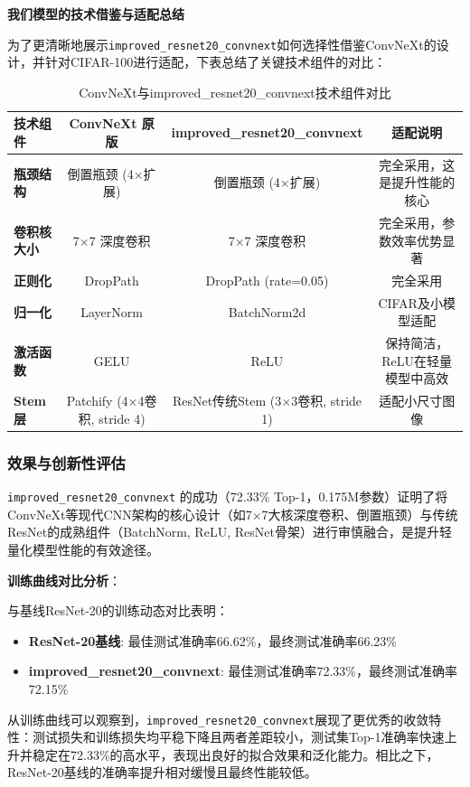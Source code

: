\documentclass[a4paper]{article}
\begin{document}
\begin{description}
\textbf{我们模型的技术借鉴与适配总结}

为了更清晰地展示\texttt{improved\_resnet20\_convnext}如何选择性借鉴ConvNeXt的设计，并针对CIFAR-100进行适配，下表总结了关键技术组件的对比：

\begin{table}[H]
\centering
\caption{ConvNeXt与improved\_resnet20\_convnext技术组件对比}
\begin{tabular}{lccc}
\toprule
\textbf{技术组件} & \textbf{ConvNeXt 原版} & \textbf{improved\_resnet20\_convnext} & \textbf{适配说明} \\
\midrule
\textbf{瓶颈结构} & 倒置瓶颈 (4×扩展) & 倒置瓶颈 (4×扩展) & 完全采用，这是提升性能的核心 \\
\textbf{卷积核大小} & 7×7 深度卷积 & 7×7 深度卷积 & 完全采用，参数效率优势显著 \\
\textbf{正则化} & DropPath & DropPath (rate=0.05) & 完全采用 \\
\textbf{归一化} & LayerNorm & BatchNorm2d & CIFAR及小模型适配 \\
\textbf{激活函数} & GELU & ReLU & 保持简洁，ReLU在轻量模型中高效 \\
\textbf{Stem层} & Patchify (4×4卷积, stride 4) & ResNet传统Stem (3×3卷积, stride 1) & 适配小尺寸图像 \\
\bottomrule
\end{tabular}
\end{table}

\subsubsection{效果与创新性评估}

\texttt{improved\_resnet20\_convnext} 的成功（72.33\% Top-1，0.175M参数）证明了将ConvNeXt等现代CNN架构的核心设计（如7×7大核深度卷积、倒置瓶颈）与传统ResNet的成熟组件（BatchNorm, ReLU, ResNet骨架）进行审慎融合，是提升轻量化模型性能的有效途径。

\textbf{训练曲线对比分析}：

与基线ResNet-20的训练动态对比表明：
\begin{itemize}
    \item \textbf{ResNet-20基线}: 最佳测试准确率66.62\%，最终测试准确率66.23\%
    \item \textbf{improved\_resnet20\_convnext}: 最佳测试准确率72.33\%，最终测试准确率72.15\%
\end{itemize}

从训练曲线可以观察到，\texttt{improved\_resnet20\_convnext}展现了更优秀的收敛特性：测试损失和训练损失均平稳下降且两者差距较小，测试集Top-1准确率快速上升并稳定在72.33\%的高水平，表现出良好的拟合效果和泛化能力。相比之下，ResNet-20基线的准确率提升相对缓慢且最终性能较低。


\end{description}
\end{document}
